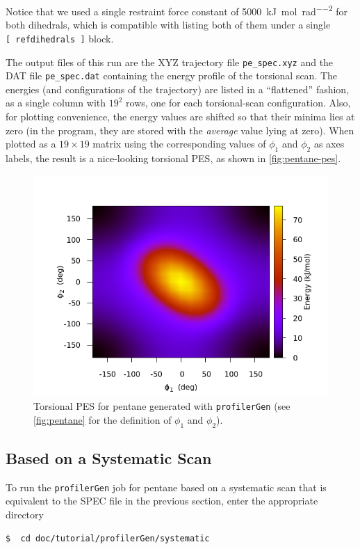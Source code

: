 \documentclass[10pt,a4paper,openany]{memoir}
\numberwithin{equation}{section}
\newcommand{\profilergen}[0]{\texttt{profilerGen}}
\begin{document}
\noindent
Notice that we used a single restraint force constant of
\SI{5000}{\kJ\per\mole\per\radian\squared} for both dihedrals, which
is compatible with listing both of them
under a single \texttt{[~refdihedrals~]} block.

The output files of this run are the XYZ trajectory file \texttt{pe\_spec.xyz}
and the DAT file \texttt{pe\_spec.dat} containing the energy profile of the
torsional scan. The energies (and configurations of the trajectory) are listed
in a ``flattened'' fashion, as a single column with $19^2$ rows, one for each
torsional-scan configuration. Also, for plotting convenience, the energy values
are shifted so that their minima lies at zero (in the program, they are stored
with the \textit{average} value lying at zero).  When plotted as a $19\times 19$
matrix using the corresponding values of $\phi_1$ and $\phi_2$ as axes labels,
the result is a nice-looking torsional PES, as shown in
\autoref{fig:pentane-pes}.

\begin{figure}[tb]
  \centering
  \includegraphics[width=.6\textwidth]{pe_spec}
  \caption{Torsional PES for pentane generated with \profilergen{}
    (see \autoref{fig:pentane} for the definition of $\phi_1$ and
    $\phi_2$).}
  \label{fig:pentane-pes}
\end{figure}

\subsection{Based on a Systematic Scan}
\label{sec:tutorial-profilergen-scan}

To run the \profilergen{} job for pentane based on a systematic scan
that is equivalent to the SPEC file in the previous section, enter the
appropriate directory

\begin{lstlisting}[language=bash]
$  cd doc/tutorial/profilerGen/systematic
\end{lstlisting}\vspace{2ex}\par
\end{document}
